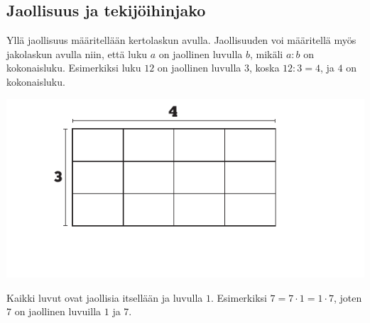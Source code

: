 \subsection*{Jaollisuus ja tekijöihinjako}

   
    
    \begin{esimerkki}
    \begin{alakohdat}
    \end{alakohdat}
    \end{esimerkki}
    
    

    
    Yllä jaollisuus määritellään kertolaskun avulla. Jaollisuuden voi määritellä myös jakolaskun avulla niin, että luku $a$ on jaollinen luvulla $b$, mikäli $a:b$ on kokonaisluku. Esimerkiksi luku $12$ on jaollinen luvulla $3$, koska $12:3 = 4$, ja $4$ on kokonaisluku.
   
    \begin{center}
     \includegraphics[scale=0.85]{pictures/Kuva2-4-3x4.pdf}
    \end{center}
    
    Kaikki luvut ovat jaollisia itsellään ja luvulla $1$. Esimerkiksi $7=7 \cdot 1=1 \cdot 7$, joten $7$ on jaollinen luvuilla $1$ ja $7$.
    
    
